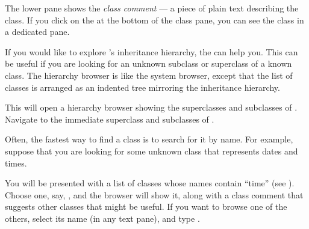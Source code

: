 \documentclass[a4paper,10pt,twoside]{book}
\begin{document}
The lower pane shows the \emph{class comment} --- a piece of plain text describing the class.
If you click on the  at the bottom of the class pane, you can see the class  in a dedicated pane.

If you would like to explore \sq's inheritance hierarchy, the  can help you.  
This can be useful if you are looking for an unknown subclass or superclass of a known class.
The hierarchy browser is like the system browser, except that the list of classes is arranged as an indented tree mirroring the inheritance hierarchy.

\noindent
This will open a hierarchy browser showing the superclasses and subclasses of .
Navigate to the immediate superclass and subclasses of .

Often, the fastest way to find a class is to search for it by name.  For example, suppose that you are looking for some unknown class that represents dates and times.

\noindent
You will be presented with a list of classes whose names contain ``time'' (see ).  Choose one, say, , and the browser will show it, along with a class comment that suggests other classes that might be useful.  If you want to browse one of the others, select its name (in any text pane), and type .

\end{document}
